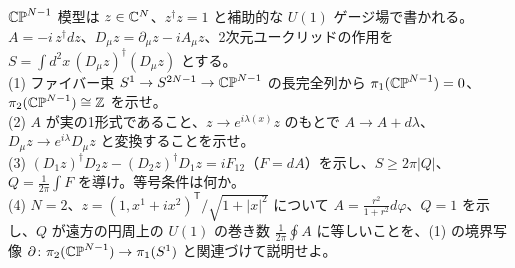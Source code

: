 \begin{problem}[難易度 C]\label{ch03-prob-cpn}
$\mathbb{CP}^{N-1}$ 模型は $z\in\mathbb{C}^N$、$z^\dagger z=1$ と補助的な $U(1)$ ゲージ場で書かれる。$A=-i\,z^\dagger dz$、$D_\mu z=\partial_\mu z-iA_\mu z$、2次元ユークリッドの作用を $S=\int d^2x\,(D_\mu z)^\dagger(D_\mu z)$ とする。\\
(1) ファイバー束 $S^1\to S^{2N-1}\to\mathbb{CP}^{N-1}$ の長完全列から $\pi_1(\mathbb{CP}^{N-1})=0$、$\pi_2(\mathbb{CP}^{N-1})\cong\mathbb{Z}$ を示せ。\\
(2) $A$ が実の1形式であること、$z\to e^{i\lambda(x)}z$ のもとで $A\to A+d\lambda$、$D_\mu z\to e^{i\lambda}D_\mu z$ と変換することを示せ。\\
(3) $(D_1z)^\dagger D_2z-(D_2z)^\dagger D_1z=iF_{12}$（$F=dA$）を示し、$S\ge2\pi\lvert Q\rvert$、$Q=\frac1{2\pi}\int F$ を導け。等号条件は何か。\\
(4) $N=2$、$z=(1,x^1+ix^2)^{\mathsf T}/\sqrt{1+\lvert x\rvert^2}$ について $A=\frac{r^2}{1+r^2}d\varphi$、$Q=1$ を示し、$Q$ が遠方の円周上の $U(1)$ の巻き数 $\frac1{2\pi}\oint A$ に等しいことを、(1) の境界写像 $\partial\colon\pi_2(\mathbb{CP}^{N-1})\to\pi_1(S^1)$ と関連づけて説明せよ。
\end{problem}

